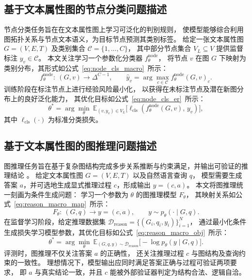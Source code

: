 \subsection{基于文本属性图的节点分类问题描述}

节点分类任务旨在在文本属性图上学习可泛化的判别规则，
使模型能够综合利用图拓扑关系与节点文本语义，为目标节点预测其类别标签。
给定一张文本属性图 $G=(V,E,T)$ 及类别集合 $\mathcal{C}=\{1,\dots,C\}$，
其中部分节点集合 $V_L\subseteq V$ 提供监督标注 $y_v\in\mathcal{C}$。
本文关注学习一个参数化分类器 $f_{\theta}^{\mathrm{node}}$，
将节点 $v$ 在图 $G$ 下映射为类别分布，其形式如公式~\ref{eq:node_cls_macro}\ 所示：
\begin{equation}
f_{\theta}^{\mathrm{node}}:\ (G,v)\rightarrow \Delta^{C-1},
\qquad 
\hat y_v=\arg\max_{c\in\mathcal{C}} f_{\theta}^{\mathrm{node}}(G,v)_c .
\label{eq:node_cls_macro}
\end{equation}
训练阶段在标注节点上进行经验风险最小化，
以获得在未标注节点及潜在新图分布上的良好泛化能力，
其优化目标如公式~\ref{eq:node_cls_er}\ 所示：
\begin{equation}
\theta^{\ast}
=
\arg\min_{\theta}\ 
\mathbb{E}_{(v,y_v)\in V_L}
\big[\ell_{\mathrm{cls}}(f_{\theta}^{\mathrm{node}}(G,v),\,y_v)\big],
\label{eq:node_cls_er}
\end{equation}
其中 $\ell_{\mathrm{cls}}(\cdot)$ 为标准分类损失。

\subsection{基于文本属性图的图推理问题描述}
\label{sec:problem_graph_reasoning}

图推理任务旨在基于复杂图结构完成多步关系推断与约束满足，并输出可验证的推理结论
\cite{hou2022survey}。
给定文本属性图 $G=(V,E,T)$ 以及自然语言查询 $q$，
模型需要生成答案 $a$，并可选地生成显式推理过程 $c$，形成输出 $y=(c,a)$。
本文将图推理统一刻画为条件生成问题：
学习一个参数为 $\theta$ 的图推理模型 $F_{\theta}$，
其映射关系如公式~\ref{eq:reason_macro_map}\ 所示：
\begin{equation}
F_{\theta}:\ (G,q)\rightarrow y=(c,a),
\qquad y\sim p_{\theta}(\cdot\mid G,q).
\label{eq:reason_macro_map}
\end{equation}
在监督学习阶段，给定推理数据集 $\mathcal{D}_{\mathrm{reason}}=\{(G_i,q_i,y_i)\}_{i=1}^{N}$，
通过最小化条件生成损失学习模型参数，其优化目标如公式~\ref{eq:reason_macro_obj}\ 所示：
\begin{equation}
\theta^{\ast}
=
\arg\min_{\theta}\ 
\mathbb{E}_{(G,q,y)\sim\mathcal{D}_{\mathrm{reason}}}
\big[-\log p_{\theta}(y\mid G,q)\big].
\label{eq:reason_macro_obj}
\end{equation}
评测时，图推理不仅关注答案 $a$ 的正确性，
还关注推理过程 $c$ 与图结构及查询约束的一致性。
理想情况下，模型输出应同时满足答案正确与过程可验证两项要求，
即 $a$ 与真实结论一致，并且 $c$ 能被外部验证器判定为结构合法、逻辑自洽。


